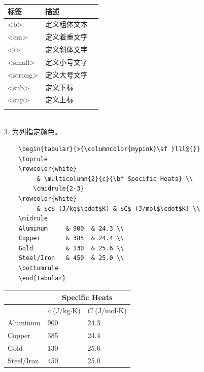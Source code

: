 \documentclass[UTF8]{book}
\newcommand{\kai}{\CJKfamily{kai}}    %
\begin{document}
{	\begin{tabular}{>{\sf }lll}    %
	\toprule	
	标签 & 描述 \\
	\midrule
	<b>	& \kai 定义粗体文本\\
	\rowcolor{mygray}          %
	<em> & \kai 定义着重文字\\
	<i> & \kai 定义斜体文字\\
	\rowcolor{mygray}
	<small> & \kai 定义小号文字\\
	<strong> & \kai 定义大号文字\\
	\rowcolor{mygray}
	<sub> & \kai 定义下标 \\
	<sup> & \kai 定义上标 \\
	\rowcolor{mygray}
	\bottomrule
	\end{tabular}\\
	
	3. 为列指定颜色。
	\begin{lstlisting}
	\begin{tabular}{>{\columncolor{mypink}\sf }lll@{}}
	\toprule
	\rowcolor{white}
		 & \multicolumn{2}{c}{\bf Specific Heats} \\
		\cmidrule{2-3}
	\rowcolor{white}
		 & $c$ (J/kg$\cdot$K) & $C$ (J/mol$\cdot$K) \\
	\midrule
	Aluminum     & 900  & 24.3 \\
	Copper       & 385  & 24.4 \\
	Gold         & 130  & 25.6 \\
	Steel/Iron   & 450  & 25.0 \\
	\bottomrule
	\end{tabular}
	\end{lstlisting}
	
	\begin{tabular}{>{\columncolor{mypink}\sf }lll@{}}
	\toprule
	\rowcolor{white}
		 & \multicolumn{2}{c}{\bf Specific Heats} \\
		\cmidrule{2-3}
	\rowcolor{white}
		 & $c$ (J/kg$\cdot$K) & $C$ (J/mol$\cdot$K) \\
	\midrule
	Aluminum     & 900  & 24.3 \\
	Copper       & 385  & 24.4 \\
	Gold         & 130  & 25.6 \\
	Steel/Iron   & 450  & 25.0 \\
	\bottomrule
	\end{tabular}\\
	

}
\end{document}
